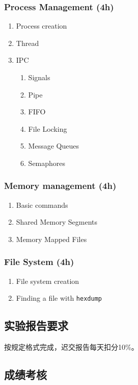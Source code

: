 \documentclass{wx672article}
\begin{document}
\subsubsection{Process Management (4h)}
\label{sec-3-4-2}

\begin{enumerate}
\item Process creation
\item Thread
\item IPC
  \begin{enumerate}
  \item Signals
  \item Pipe
  \item FIFO
  \item File Locking
  \item Message Queues
  \item Semaphores
  \end{enumerate}
\end{enumerate}

\subsubsection{Memory management (4h)}
\label{sec-3-4-3}

\begin{enumerate}
\item Basic commands
\item Shared Memory Segments
\item Memory Mapped Files
\end{enumerate}

\subsubsection{File System (4h)}
\label{sec-3-4-4}

\begin{enumerate}
\item File system creation
\item Finding a file with \texttt{hexdump}
\end{enumerate}

\subsection{实验报告要求}
\label{sec-3-5}

按规定格式完成，迟交报告每天扣分10\%。

\subsection{成绩考核}
\label{sec-3-6}
\end{document}
